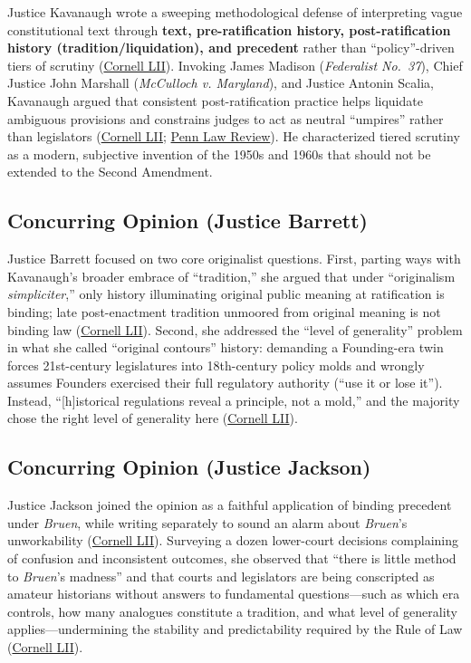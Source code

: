 \documentclass[12pt]{article}
\begin{document}
Justice Kavanaugh wrote a sweeping methodological defense of interpreting vague constitutional text through \textbf{text, pre-ratification history, post-ratification history (tradition/liquidation), and precedent} rather than ``policy''-driven tiers of scrutiny (\href{https://www.law.cornell.edu/supremecourt/text/22-915}{Cornell LII}). Invoking James Madison (\textit{Federalist No.\ 37}), Chief Justice John Marshall (\textit{McCulloch v. Maryland}), and Justice Antonin Scalia, Kavanaugh argued that consistent post-ratification practice helps liquidate ambiguous provisions and constrains judges to act as neutral ``umpires'' rather than legislators (\href{https://www.law.cornell.edu/supremecourt/text/22-915}{Cornell LII}; \href{https://pennlawreview.com/2025/06/10/kavanaugh-rahimi-and-the-effort-to-legitimate-originalism/}{Penn Law Review}). He characterized tiered scrutiny as a modern, subjective invention of the 1950s and 1960s that should not be extended to the Second Amendment.

\subsection{Concurring Opinion (Justice Barrett)}

Justice Barrett focused on two core originalist questions. First, parting ways with Kavanaugh's broader embrace of ``tradition,'' she argued that under ``originalism \textit{simpliciter},'' only history illuminating original public meaning at ratification is binding; late post-enactment tradition unmoored from original meaning is not binding law (\href{https://www.law.cornell.edu/supremecourt/text/22-915}{Cornell LII}). Second, she addressed the ``level of generality'' problem in what she called ``original contours'' history: demanding a Founding-era twin forces 21st-century legislatures into 18th-century policy molds and wrongly assumes Founders exercised their full regulatory authority (``use it or lose it''). Instead, ``[h]istorical regulations reveal a principle, not a mold,'' and the majority chose the right level of generality here (\href{https://www.law.cornell.edu/supremecourt/text/22-915}{Cornell LII}).

\subsection{Concurring Opinion (Justice Jackson)}

Justice Jackson joined the opinion as a faithful application of binding precedent under \textit{Bruen}, while writing separately to sound an alarm about \textit{Bruen}'s unworkability (\href{https://www.law.cornell.edu/supremecourt/text/22-915}{Cornell LII}). Surveying a dozen lower-court decisions complaining of confusion and inconsistent outcomes, she observed that ``there is little method to \textit{Bruen}'s madness'' and that courts and legislators are being conscripted as amateur historians without answers to fundamental questions---such as which era controls, how many analogues constitute a tradition, and what level of generality applies---undermining the stability and predictability required by the Rule of Law (\href{https://www.law.cornell.edu/supremecourt/text/22-915}{Cornell LII}).
\end{document}
